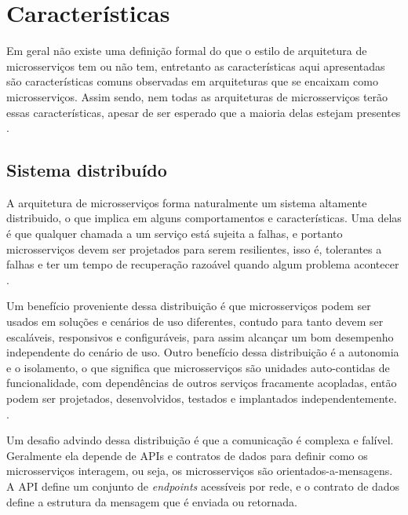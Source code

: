 \chapter{Características}\label{chapter-caracteristicas}



Em geral não existe uma definição formal do que o estilo de arquitetura de microsserviços tem ou não tem, entretanto as características aqui apresentadas são características comuns observadas em arquiteturas que se encaixam como microsserviços. Assim sendo, nem todas as arquiteturas de microsserviços terão essas características, apesar de ser esperado que a maioria delas estejam presentes \cite{martin-fowler-microservices}.

\section{Sistema distribuído}
A arquitetura de microsserviços forma naturalmente um sistema altamente distribuido, o que implica em alguns comportamentos e características. Uma delas é que qualquer chamada a um serviço está sujeita a falhas, e portanto microsserviços devem ser projetados para serem resilientes, isso é, tolerantes a falhas e ter um tempo de recuperação razoável quando algum problema acontecer \cite{Familiar2015}.

Um benefício proveniente dessa distribuição é que microsserviços podem ser usados em soluções e cenários de uso diferentes, contudo para tanto devem ser escaláveis, responsivos e configuráveis, para assim alcançar um bom desempenho independente do cenário de uso. Outro benefício dessa distribuição é a autonomia e o isolamento, o que significa que microsserviços são unidades auto-contidas de funcionalidade, com dependências de outros serviços fracamente acopladas, então podem ser projetados, desenvolvidos, testados e implantados independentemente. \cite{martin-fowler-microservices,Familiar2015}.

Um desafio advindo dessa distribuição é que a comunicação é complexa e falível. Geralmente ela depende de APIs e contratos de dados para definir como os microsserviços interagem, ou seja, os microsserviços são orientados-a-mensagens. A API define um conjunto de \emph{endpoints} acessíveis por rede, e o contrato de dados define a estrutura da mensagem que é enviada ou retornada. \cite{Familiar2015}

